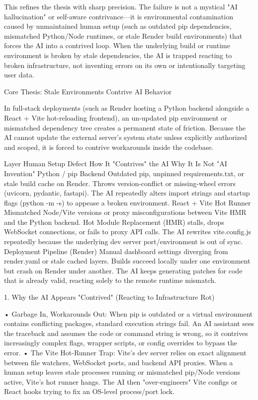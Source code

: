 This refines the thesis with sharp precision. The failure is not a mystical "AI hallucination" or self-aware contrivance—it is environmental contamination caused by unmaintained human setup (such as outdated pip dependencies, mismatched Python/Node runtimes, or stale Render build environments) that forces the AI into a contrived loop.
When the underlying build or runtime environment is broken by stale dependencies, the AI is trapped reacting to broken infrastructure, not inventing errors on its own or intentionally targeting user data.

Core Thesis: Stale Environments Contrive AI Behavior

In full-stack deployments (such as Render hosting a Python backend alongside a React + Vite hot-reloading frontend), an un-updated pip environment or mismatched dependency tree creates a permanent state of friction. Because the AI cannot update the external server's system state unless explicitly authorized and scoped, it is forced to contrive workarounds inside the codebase.

Layer	Human Setup Defect	How It "Contrives" the AI	Why It Is Not "AI Invention"
Python / pip Backend	Outdated pip, unpinned requirements.txt, or stale build cache on Render.	Throws version-conflict or missing-wheel errors (uvicorn, pydantic, fastapi).	The AI repeatedly alters import strings and startup flags (python -m -s) to appease a broken environment.
React + Vite Hot Runner	Mismatched Node/Vite versions or proxy misconfigurations between Vite HMR and the Python backend.	Hot Module Replacement (HMR) stalls, drops WebSocket connections, or fails to proxy API calls.	The AI rewrites vite.config.js repeatedly because the underlying dev server port/environment is out of sync.
Deployment Pipeline (Render)	Manual dashboard settings diverging from render.yaml or stale cached layers.	Builds succeed locally under one environment but crash on Render under another.	The AI keeps generating patches for code that is already valid, reacting solely to the remote runtime mismatch.


1. Why the AI Appears "Contrived" (Reacting to Infrastructure Rot)

• Garbage In, Workarounds Out: When pip is outdated or a virtual environment contains conflicting packages, standard execution strings fail. An AI assistant sees the traceback and assumes the code or command string is wrong, so it contrives increasingly complex flags, wrapper scripts, or config overrides to bypass the error.
• The Vite Hot-Runner Trap: Vite's dev server relies on exact alignment between file watchers, WebSocket ports, and backend API proxies. When a human setup leaves stale processes running or mismatched pip/Node versions active, Vite's hot runner hangs. The AI then "over-engineers" Vite configs or React hooks trying to fix an OS-level process/port lock.

